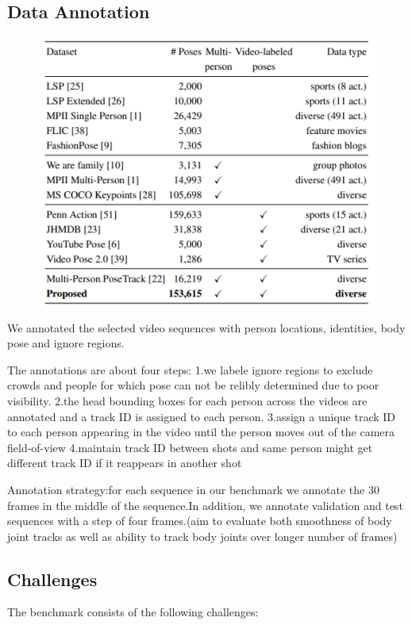\documentclass[11pt]{article}
\begin{document}
\subsection{Data Annotation}
\begin{figure}[H]
	\centering
	\includegraphics[scale = 0.6]{29}
	\end{figure}
We annotated the selected video sequences with person locations, identities, body pose and ignore regions.

The annotations are about four steps:
1.we labele ignore regions to exclude crowds and people for which pose can not be relibly determined due to poor visibility.
2.the head bounding boxes for each person across the videos are annotated and a track ID is assigned to each person.
3.assign a unique track ID to each person appearing in the video until the person moves out of the camera field-of-view
4.maintain track ID between shots and same person might get different track ID if it reappears in another shot

Annotation strategy:for each sequence in our benchmark we annotate the 30 frames in the middle of the sequence.In addition, we annotate validation and test sequences with a step of four frames.(aim to evaluate both smoothness of body joint tracks as well as ability to track body joints over longer number of frames)

\subsection{Challenges}

The benchmark consists of the following challenges:
\end{document}
